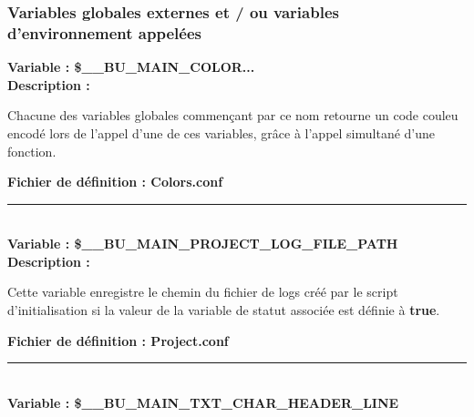 \documentclass[a4paper,10pt]{article}
\begin{document}
\color{sec3}
\subsubsection{Variables globales externes et / ou variables d'environnement appelées}\color{text}

\textbf{Variable : \color{vars}\$\_\_BU\_MAIN\_COLOR...}\\[1\baselineskip]

\textbf{Description :}

\begin{justify}
    Chacune des variables globales commençant par ce nom retourne un code couleu encodé lors de l'appel d'une de ces variables, grâce à l'appel simultané d'une fonction.
\end{justify}

\textbf{Fichier de définition : \color{lime}Colors.conf}\\[1\baselineskip]




\color{vars}\par\noindent\rule{\textwidth}{0.4pt}\color{text}\\[1\baselineskip]

\textbf{Variable : \color{vars}\$\_\_BU\_MAIN\_PROJECT\_LOG\_FILE\_PATH}\\[1\baselineskip]

\textbf{Description :}

\begin{justify}
    Cette variable enregistre le chemin du fichier de logs créé par le script d'initialisation si la valeur de la variable de statut associée est définie à \textbf{\color{gray}true}.
\end{justify}

\textbf{Fichier de définition : \color{lime}Project.conf} \\[1\baselineskip]




\color{vars}\par\noindent\rule{\textwidth}{0.4pt}\color{text}\\[1\baselineskip]

\textbf{Variable : \color{vars}\$\_\_BU\_MAIN\_TXT\_CHAR\_HEADER\_LINE}\\[1\baselineskip]
\end{document}
